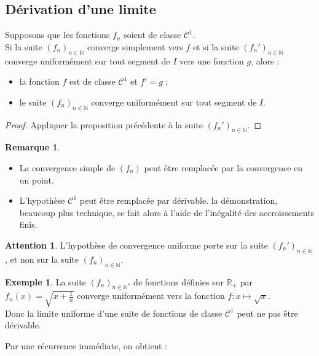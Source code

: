 \documentclass[french]{article}
\newcommand{\N}{\mathbb{N}}
\newcommand{\R}{\mathbb{R}}
\newcommand{\st}{^*}
\theoremstyle{plain}
\theoremstyle{definition}
\newtheorem*{ex}{Exemple}
\newtheorem*{rmq}{Remarque}
\newtheorem*{attention}{Attention}
\theoremstyle{remark}
\begin{document}
\subsection{Dérivation d'une limite}

\begin{prop}
	Supposons que les fonctions $f_n$ soient de classe $\mathcal{C}^1$.\\
	Si la suite $(f_n)_{n\in\N}$ converge simplement vers $f$ et si la suite $(f_n')_{n\in\N}$ converge uniformément sur tout segment de $I$ vers une fonction $g$, alors :
	\begin{itemize}
		\item la fonction $f$ est de classe $\mathcal{C}^1$ et $f'=g$ ;
		\item le suite $(f_n)_{n\in\N}$ converge uniformément sur tout segment de $I$.
	\end{itemize}
\end{prop}
\begin{proof}
	Appliquer la proposition précédente à la suite $(f_n')_{n\in\N}$.
\end{proof}

\begin{rmq}
	\begin{itemize}
		\item La convergence simple de $(f_n)$ peut être remplacée par la convergence en un point.
		\item L'hypothèse $\mathcal{C}^1$ peut être remplacée par dérivable. la démonstration, beaucoup plus technique, se fait alors à l'aide de l'inégalité des accroissements finis.
	\end{itemize}
\end{rmq}

\begin{attention}
	L'hypothèse de convergence uniforme porte sur la suite $(f_n')_{n\in\N}$, et non sur la suite $(f_n)_{n\in\N}$.
\end{attention}

\begin{ex}
	La suite $(f_n)_{n\in\N\st}$ de fonctions définies sur $\R_+$ par $f_n(x)=\displaystyle\sqrt{x+\frac{1}{n}}$ converge uniformément vers la fonction $f:x\mapsto\sqrt{x}$.\\
	Donc la limite uniforme d'une suite de fonctions de classe $\mathcal{C}^1$ peut ne pas être dérivable.
\end{ex}

Par une récurrence immédiate, on obtient :
\end{document}
